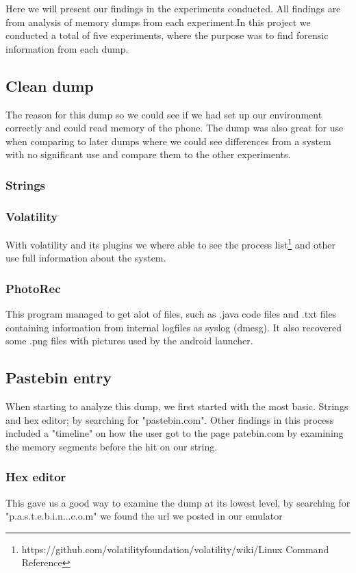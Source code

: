 Here we will present our findings in the experiments conducted. All findings are from analysis of memory dumps from each experiment.In this project we conducted a total of five experiments, where the purpose was to find forensic information from each dump.
\subsection{Clean dump}
The reason for this dump so we could see if we had set up our environment correctly and could read memory of the phone. The dump was also great for use when comparing to later dumps where we could see differences from a system with no significant use and compare them to the other experiments.
\subsubsection{Strings}
\subsubsection{Volatility}
With volatility and its plugins we where able to see the process list\footnote{https://github.com/volatilityfoundation/volatility/wiki/Linux Command Reference} and other use full information about the system.
\subsubsection{PhotoRec}
This program managed to get alot of files, such as .java code files and .txt files containing information from internal logfiles as syslog (dmesg). It also recovered some .png files with pictures used by the android launcher.
\subsection{Pastebin entry}
When starting to analyze this dump, we first started with the most basic. Strings and hex editor; by searching for "pastebin.com". Other findings in this process included a "timeline" on how the user got to the page patebin.com by examining the memory segments before the hit on our string.
\subsubsection{Hex editor}
This gave us a good way to examine the dump at its lowest level, by searching for "p.a.s.t.e.b.i.n...c.o.m" we found the url we posted in our emulator
